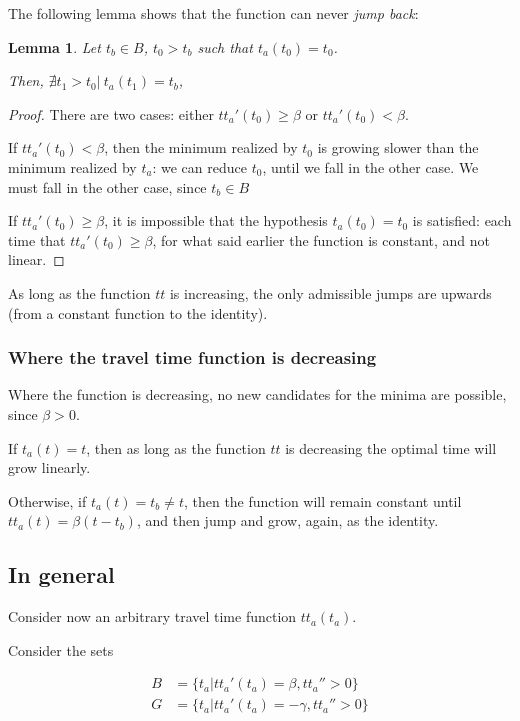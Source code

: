 \documentclass{article}
\newtheorem{lemma}[theorem]{Lemma}
\begin{document}
The following lemma shows that the function can never \textit{jump back}:

\begin{lemma}
  Let \(t_b \in B\), \(t_0 > t_b\) such that \(t_a(t_0) = t_0\).
  
  Then, \(\nexists t_1 > t_0 |\ t_a(t_1) = t_b\),
\end{lemma}
\begin{proof}
  There are two cases: either \(tt_a'(t_0) \geq \beta\) or \(tt_a'(t_0) < \beta\).

  If  \(tt_a'(t_0) < \beta\), then the minimum realized  by \(t_0\) is growing slower than the minimum realized by \(t_a\): we can reduce \(t_0\), until we fall in the other case. We must fall in the other case, since \(t_b \in B\)

  If \(tt_a'(t_0) \geq \beta\), it is impossible that the hypothesis \(t_a(t_0) = t_0\) is satisfied:
  each time that \(tt_a'(t_0) \geq \beta\), for what said earlier the function is constant, and not linear.
\end{proof}

As long as the function \(tt\) is increasing, the only admissible jumps are upwards (from a constant function to the identity).

\subsubsection{Where the travel time function is decreasing}

Where the function is decreasing, no new candidates for the minima are possible, since \(\beta > 0\).

If \(t_a(t) = t\), then as long as the function \(tt\) is decreasing the optimal time will grow linearly.

Otherwise, if \(t_a(t) = t_b \neq t\), then the function will remain constant until \(tt_a(t) = \beta (t - t_b)\),
and then jump and grow, again, as the identity.

\subsection{In general}

Consider now an arbitrary travel time function \(tt_a(t_a)\).

Consider the sets

\begin{align*}
  B & = \{t_a | tt_a'(t_a) = \beta, tt_a'' > 0\} \\
  G & = \{t_a | tt_a'(t_a) = -\gamma, tt_a'' > 0\} \\
\end{align*}
\end{document}
